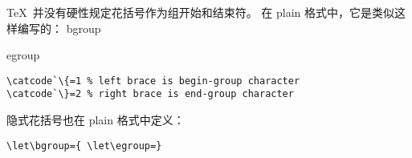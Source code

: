 \documentclass[letterpaper]{book}
\begin{document}
\TeX\ 并没有硬性规定花括号作为组开始和结束符。
在 plain 格式中，它是类似这样编写的：
\cstoidx bgroup\par\cstoidx egroup\par
\begin{verbatim}
\catcode`\{=1 % left brace is begin-group character
\catcode`\}=2 % right brace is end-group character
\end{verbatim}
隐式花括号也在 plain 格式中定义：
\begin{verbatim}
\let\bgroup={ \let\egroup=}
\end{verbatim}
\end{document}
